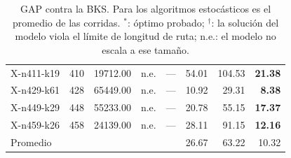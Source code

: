 \begin{table}[htbp]
\begin{tabular}{lrrrrrrr}
X-n411-k19 & 410 & 19712.00 & n.e. & --- & 54.01 & 104.53 & \textbf{21.38} \\
X-n429-k61 & 428 & 65449.00 & n.e. & --- & 10.92 & 29.31 & \textbf{8.38} \\
X-n449-k29 & 448 & 55233.00 & n.e. & --- & 20.78 & 55.15 & \textbf{17.37} \\
X-n459-k26 & 458 & 24139.00 & n.e. & --- & 28.11 & 91.15 & \textbf{12.16} \\
\midrule
Promedio & & & &  & 26.67 & 63.22 & 10.32 \\
\bottomrule
\end{tabular}
\caption{GAP contra la BKS. Para los algoritmos estocásticos es el promedio de las corridas. $^*$: óptimo probado; $^\dagger$: la solución del modelo viola el límite de longitud de ruta; n.e.: el modelo no escala a ese tamaño.}
\label{tab:comparacion_gap}
\end{table}
